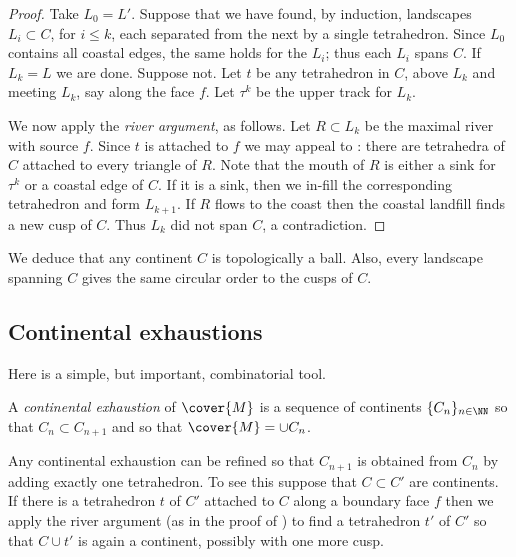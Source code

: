 \documentclass[12pt]{amsart}
\begin{document}
\begin{proof}
Take $L_0 = L'$.  Suppose that we have found, by induction, landscapes $L_i \subset C$, for $i \leq k$, each separated from the next by a single tetrahedron.  Since $L_0$ contains all coastal edges, the same holds for the $L_i$; thus each $L_i$ spans $C$.  If $L_k = L$ we are done.  Suppose not.  Let $t$ be any tetrahedron in $C$, above $L_k$ and meeting $L_k$, say along the face $f$.  Let $\tau^k$ be the upper track for $L_k$.  

We now apply the \emph{river argument}, as follows.  Let $R \subset L_k$ be the maximal river with source $f$.  Since $t$ is attached to $f$ we may appeal to : there are tetrahedra of $C$ attached to every triangle of $R$.  Note that the mouth of $R$ is either a sink for $\tau^k$ or a coastal edge of $C$.  If it is a sink, then we in-fill the corresponding tetrahedron and form $L_{k+1}$.  If $R$ flows to the coast then the coastal landfill finds a new cusp of $C$.  Thus $L_k$ did not span $C$, a contradiction. 
\end{proof}

We deduce that any continent $C$ is topologically a ball.  Also, every landscape spanning $C$ gives the same circular order to the cusps of $C$.

\subsection{Continental exhaustions}
Here is a simple, but important, combinatorial tool.

\begin{definition}
\label{Def:ContinentalExhaustion}
A \emph{continental exhaustion} of $\cover{M}$ is a sequence of continents $\{C_n\}_{n \in \NN}$ so that $C_n \subset C_{n+1}$ and so that $\cover{M} = \cup C_n$. 
\end{definition}

\begin{remark}
\label{Rem:OneAtATime}
Any continental exhaustion can be refined so that $C_{n+1}$ is obtained from $C_n$ by adding exactly one tetrahedron.  To see this suppose that $C \subset C'$ are continents.  If there is a tetrahedron $t$ of $C'$ attached to $C$ along a boundary face $f$ then we apply the river argument (as in the proof of ) to find a tetrahedron $t'$ of $C'$ so that $C \cup t'$ is again a continent, possibly with one more cusp. 
\end{remark}
\end{document}
